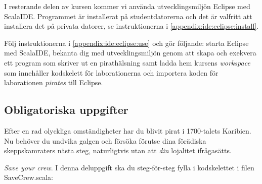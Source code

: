 I resterande delen av kursen kommer vi använda utvecklingsmiljön Eclipse med ScalaIDE. Programmet är installerat på studentdatorerna och det är valfritt att installera det på privata datorer, se instruktionerna i \ref{appendix:ide:eclipse:install}. 

Följ instruktionerna i \ref{appendix:ide:eclipse:use} och gör följande: starta Eclipse med ScalaIDE, bekanta dig med utvecklingsmiljön genom att skapa och exekvera ett program som skriver ut en pirathälsning samt ladda hem kursens \emph{workspace} som innehåller kodskelett för laborationerna och importera koden för laborationen \emph{pirates} till Eclipse. 




\subsection{Obligatoriska uppgifter}
Efter en rad olyckliga omständigheter har du blivit pirat i 1700-talets Karibien. Nu beh{\"o}ver du undvika galgen och f{\"o}rs{\"o}ka f{\"o}rutse dina f{\"o}r{\"a}diska skeppskamraters n{\"a}sta steg, naturligtvis utan att \emph{din} lojalitet ifrågasätts. 

\Task \emph{Save your crew}. 
I denna deluppgift ska du steg-för-steg fylla i kodskelettet i filen SaveCrew.scala:

